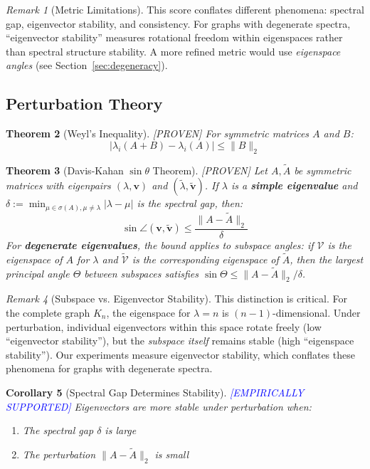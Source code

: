 \documentclass[11pt,a4paper]{article}
\newtheorem{theorem}{Theorem}[section]
\newtheorem{corollary}[theorem]{Corollary}
\theoremstyle{definition}
\theoremstyle{remark}
\newtheorem{remark}[theorem]{Remark}
\newcommand{\norm}[1]{\| #1 \|}
\newcommand{\proven}{\textcolor{green!50!black}{[PROVEN]}}
\newcommand{\supported}{\textcolor{blue}{[EMPIRICALLY SUPPORTED]}}
\begin{document}
\begin{remark}[Metric Limitations]
This score conflates different phenomena: spectral gap, eigenvector stability, and consistency. For graphs with degenerate spectra, ``eigenvector stability'' measures rotational freedom within eigenspaces rather than spectral structure stability. A more refined metric would use \emph{eigenspace angles} (see Section~\ref{sec:degeneracy}).
\end{remark}

\subsection{Perturbation Theory}

\begin{theorem}[Weyl's Inequality] \proven
For symmetric matrices $A$ and $B$:
\[
|\lambda_i(A + B) - \lambda_i(A)| \leq \norm{B}_2
\]
\end{theorem}

\begin{theorem}[Davis-Kahan $\sin\theta$ Theorem] \proven
\label{thm:davis-kahan}
Let $A, \tilde{A}$ be symmetric matrices with eigenpairs $(\lambda, \mathbf{v})$ and $(\tilde{\lambda}, \tilde{\mathbf{v}})$. If $\lambda$ is a \textbf{simple eigenvalue} and $\delta := \min_{\mu \in \sigma(A), \mu \neq \lambda} |\lambda - \mu|$ is the spectral gap, then:
\[
\sin \angle(\mathbf{v}, \tilde{\mathbf{v}}) \leq \frac{\norm{A - \tilde{A}}_2}{\delta}
\]
For \textbf{degenerate eigenvalues}, the bound applies to subspace angles: if $\mathcal{V}$ is the eigenspace of $A$ for $\lambda$ and $\tilde{\mathcal{V}}$ is the corresponding eigenspace of $\tilde{A}$, then the largest principal angle $\Theta$ between subspaces satisfies $\sin \Theta \leq \norm{A - \tilde{A}}_2 / \delta$.
\end{theorem}

\begin{remark}[Subspace vs. Eigenvector Stability]
This distinction is critical. For the complete graph $K_n$, the eigenspace for $\lambda = n$ is $(n-1)$-dimensional. Under perturbation, individual eigenvectors within this space rotate freely (low ``eigenvector stability''), but the \emph{subspace itself} remains stable (high ``eigenspace stability''). Our experiments measure eigenvector stability, which conflates these phenomena for graphs with degenerate spectra.
\end{remark}

\begin{corollary}[Spectral Gap Determines Stability] \supported
\label{cor:gap-stability}
Eigenvectors are more stable under perturbation when:
\begin{enumerate}[label=(\alph*)]
    \item The spectral gap $\delta$ is large
    \item The perturbation $\norm{A - \tilde{A}}_2$ is small
\end{enumerate}
\end{corollary}
\end{document}
